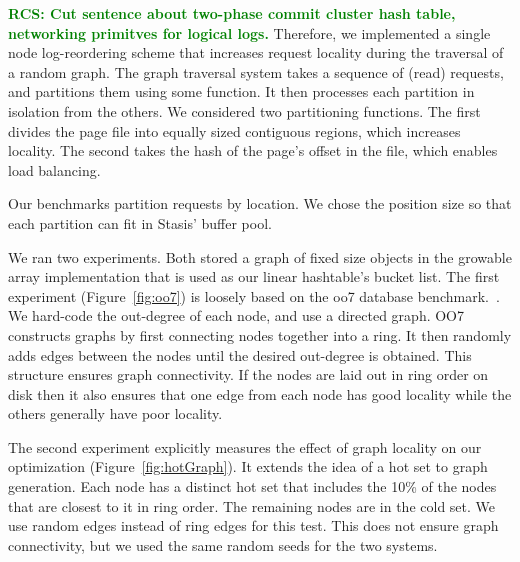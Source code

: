 \documentclass[letterpaper,twocolumn,10pt]{article}
\newcommand{\yad}{Stasis\xspace}
\newcommand{\yads}{Stasis'\xspace}
\newcommand{\diff}[1]{\textcolor{blue}{\bf #1}}
\newcommand{\rcs}[1]{\textcolor{green}{\bf RCS: #1}}
\begin{document}
\rcs{Cut sentence about two-phase commit cluster hash table, networking primitves for logical logs.}
Therefore, we implemented a single node log-reordering scheme that increases request locality
during the traversal of a random graph.  The graph traversal system
takes a sequence of (read) requests, and partitions them using some
function.  It then processes each partition in isolation from the
others.  We considered two partitioning functions.  The first divides the page file
into equally sized contiguous regions, which increases locality.  The second takes the hash
of the page's offset in the file, which enables load balancing.

Our benchmarks partition requests by location.  We chose the
position size so that each partition can fit in \yads buffer pool.

We ran two experiments.  Both stored a graph of fixed size objects in
the growable array implementation that is used as our linear
hashtable's bucket list.
The first experiment (Figure~\ref{fig:oo7})
is loosely based on the oo7 database benchmark.~\cite{oo7}.  We
hard-code the out-degree of each node, and use a directed graph.  OO7
constructs graphs by first connecting nodes together into a ring.
It then randomly adds edges between the nodes until the desired
out-degree is obtained.  This structure ensures graph connectivity.
If the nodes are laid out in ring order on disk then it also ensures that
one edge from each node has good locality while the others generally
have poor locality.

The second experiment explicitly measures the effect of graph locality
on our optimization (Figure~\ref{fig:hotGraph}). It extends the idea
of a hot set to graph generation.  Each node has a distinct hot set
that includes the 10\% of the nodes that are closest to it in ring
order.  The remaining nodes are in the cold set.  We use random edges
instead of ring edges for this test.  This does not ensure graph
connectivity, but we used the same random seeds for the two systems.
\end{document}
